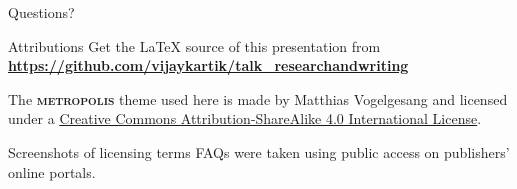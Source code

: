 \documentclass[10pt]{beamer}
\newcommand{\themename}{\textbf{\textsc{metropolis}}\xspace}
\begin{document}
{
\begin{frame}
  Questions?
\end{frame}
}

\begin{frame}{Attributions}
  Get the LaTeX source of this presentation from \\
  \textbf{\small{\url{https://github.com/vijaykartik/talk_researchandwriting}}}
  \vspace{0.5in}
  
  The \themename theme used here is made by Matthias Vogelgesang and licensed under a
  \href{http://creativecommons.org/licenses/by-sa/4.0/}{Creative Commons
  Attribution-ShareAlike 4.0 International License}.
  \begin{center}\ccbysa\end{center}
  \vspace{0.5in}
  
  Screenshots of licensing terms FAQs were taken using public access on publishers' online portals.
\end{frame}
\end{document}
